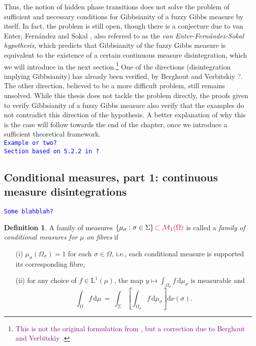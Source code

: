 \documentclass[12pt]{article}
\renewcommand{\d}{\mathrm{d}}
\newcommand{\M}{\mathcal{M}}
\newcommand{\set}[1]{\left\{#1\right\}}
\newcommand{\oglati}[1]{\left[#1\right]}
\newcommand{\1}{\mathbbm{1}}
\newcommand{\5}{\vspace{0.5cm}}
\theoremstyle{definition}
\newtheorem{df}[thm]{Definition}
\begin{document}
Thus, the notion of hidden phase transitions does not solve the problem of sufficient and necessary conditions for Gibbsianity of a fuzzy Gibbs measure by itself. In fact, the problem is still open, though there is a conjecture due to van Enter, Fern\'andez and Sokal \cite{Ber}, also referred to as the \textit{van Enter-Fern\'andez-Sokal hypothesis}, which predicts that Gibbsianity of the fuzzy Gibbs measure is equivalent to the existence of a certain continuous measure disintegration, which we will introduce in the next section.\footnote{\textcolor{purple}{This is not the original formulation from \cite{EFS}, but a correction due to Berghout and Verbitskiy \cite{Ber}.}} One of the directions (disintegration implying Gibbsianity) has already been verified, by Berghout and Verbitskiy \textcolor{red}{\cite{Ber}?}. The other direction, believed to be a more difficult problem, still remains unsolved. While this thesis does not tackle the problem directly, the proofs given to verify Gibbsianity of a fuzzy Gibbs measure also verify that the examples do not contradict this direction of the hypothesis. A better explanation of why this is the case will follow towards the end of the chapter, once we introduce a sufficient theoretical framework. \\

\textcolor{blue}{\texttt{Example or two?}} \\

\textcolor{blue}{\texttt{Section based on 5.2.2 in \textcolor{red}{\cite{Ber}}?}}


\subsection{Conditional measures, part 1: continuous measure disintegrations}

\textcolor{blue}{\texttt{Some blahblah?}}

\begin{df}
A family of measures $\set{\mu_\sigma:\sigma\in\Sigma}\textcolor{purple}{\subset\M_1(\Omega)}$ is called a \textit{family of conditional measures for $\mu$ on fibres} if
\begin{itemize}
	\item[(i)] $\mu_\sigma(\Omega_\sigma)=1$ for each $\sigma\in\Omega$, i.e., each conditional measure is supported its corresponding fibre,
	\item[(ii)] for any choice of $f\in\mathrm{L}^1(\mu)$, the map $y\mapsto\int_{\Omega_\sigma} f\,\d\mu_\sigma$ is measurable and
	$$\int_\Omega f\,\d\mu ~=~ \int_{\Sigma}\!\oglati{\int_{\Omega_\sigma} f\,\d\mu_\sigma}\!\d\nu(\sigma).$$
\end{itemize}
\end{df}
\end{document}
